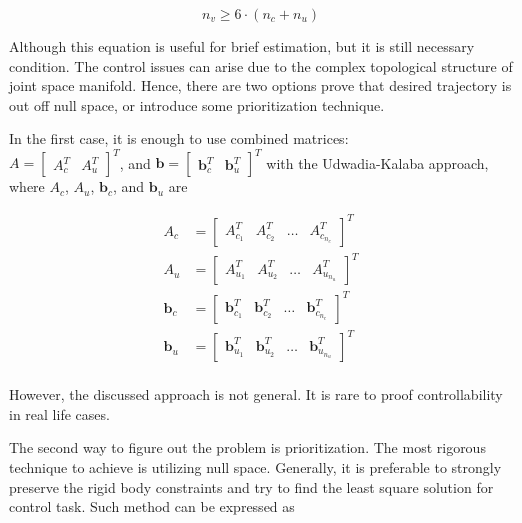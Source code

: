 \begin{equation}
    n_v \geq 6 \cdot (n_c + n_u)
\end{equation}

Although this equation is useful for brief estimation, but it is still necessary 
condition. The control issues can arise due to the complex topological structure 
of joint space manifold. Hence, there are two options prove that desired 
trajectory is out off null space, or introduce some prioritization technique.

In the first case, it is enough to use combined matrices: \\
$A = \begin{bmatrix} A_c^T & A_u^T \end{bmatrix}^T$, and 
$\mathbf{b} = \begin{bmatrix} \mathbf{b}_c^T & \mathbf{b}_u^T \end{bmatrix}^T$ 
with the Udwadia-Kalaba approach, where $A_c$, $A_u$, $\mathbf{b}_c$, and 
$\mathbf{b}_u$ are 

\begin{equation}
    \begin{aligned}
        A_c & = \begin{bmatrix}
            A_{c_1}^T & A_{c_2}^T & \dots & A_{c_{n_c}}^T
        \end{bmatrix}^T \\
        A_u & = \begin{bmatrix}
            A_{u_1}^T & A_{u_2}^T & \dots & A_{u_{n_u}}^T
        \end{bmatrix}^T \\
        \mathbf{b}_c &= \begin{bmatrix}
            \mathbf{b}_{c_1}^T & \mathbf{b}_{c_2}^T & \dots & 
            \mathbf{b}_{c_{n_c}}^T
        \end{bmatrix}^T \\
        \mathbf{b}_u &= \begin{bmatrix}
            \mathbf{b}_{u_1}^T & \mathbf{b}_{u_2}^T & \dots & 
            \mathbf{b}_{u_{n_u}}^T
        \end{bmatrix}^T \\
    \end{aligned}
    \label{eqn:combined_a_and_b}
\end{equation}

However, the discussed approach is not general. It is rare to proof 
controllability in real life cases. 

The second way to figure out the problem is prioritization. The most rigorous 
technique to achieve is utilizing null space. Generally, it is preferable to 
strongly preserve the rigid body constraints and try to find the least square 
solution for control task. Such method can be expressed as 

